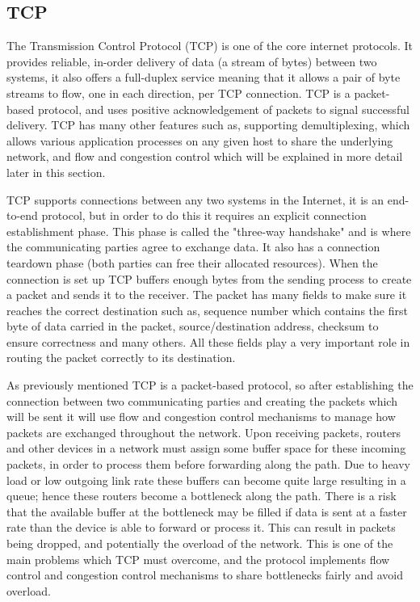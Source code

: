 \subsection{TCP}
The Transmission Control Protocol (TCP) is one of the core internet protocols.
It provides reliable, in-order delivery of data (a stream of bytes) between two
systems, it also offers a full-duplex service meaning that it allows a pair of
byte streams to flow, one in each direction, per TCP connection. TCP is a
packet-based protocol, and uses positive acknowledgement of packets to signal
successful delivery. TCP has many other features such as, supporting
demultiplexing, which allows various application processes on any given host to
share the underlying network, and flow and congestion control which will be
explained in more detail later in this section.

TCP supports connections between any two systems in the Internet, it is an
end-to-end protocol, but in order to do this it requires an explicit connection
establishment phase. This phase is called the "three-way handshake" and is where
the communicating parties agree to exchange data. It also has a connection
teardown phase (both parties can free their allocated resources). When the
connection is set up TCP buffers enough bytes from the sending process to create
a packet and sends it to the receiver. The packet has many fields to make sure
it reaches the correct destination such as, sequence number which contains the
first byte of data carried in the packet, source/destination address, checksum
to ensure correctness and many others. All these fields play a very important
role in routing the packet correctly to its destination.

As previously mentioned TCP is a packet-based protocol, so after establishing
the connection between two communicating parties and creating the packets which
will be sent it will use flow and congestion control mechanisms to manage how
packets are exchanged throughout the network. Upon receiving packets, routers
and other devices in a network must assign some buffer space for these incoming
packets, in order to process them before forwarding along the path. Due to heavy
load or low outgoing link rate these buffers can become quite large resulting in
a queue; hence these routers become a bottleneck along the path. There is a risk
that the available buffer at the bottleneck may be filled if data is sent at a
faster rate than the device is able to forward or process it. This can result in
packets being dropped, and potentially the overload of the network. This is one
of the main problems which TCP must overcome, and the protocol implements flow
control and congestion control mechanisms to share bottlenecks fairly and avoid
overload.

